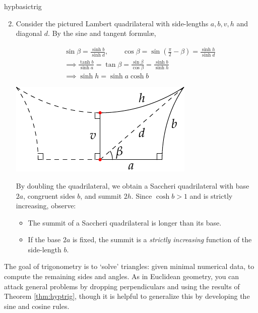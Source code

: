 \begin{examples}{}{hypbasictrig}
	
	\begin{enumerate}\setcounter{enumi}{1}
	  \item\label{ex:hyperrogueparallel} Consider the pictured Lambert quadrilateral with side-lengths $a,b,v,h$ and diagonal $d$. By the sine and tangent formulæ,\par
	  \begin{minipage}[t]{0.6\linewidth}\vspace{-17pt}
	  	\begin{align*}
			&\sin\beta=\frac{\sinh b}{\sinh d},\qquad
			\cos\beta=\sin(\tfrac\pi 2-\beta)=\frac{\sinh h}{\sinh d}\\
			&\implies \frac{\tanh b}{\sinh a}=\tan\beta=\frac{\sin\beta}{\cos\beta} =\frac{\sinh b}{\sinh h}\\
			&\implies \sinh h=\sinh a\cosh b
		\end{align*}
	  \end{minipage}
	  \hfill
	  \begin{minipage}[t]{0.39\linewidth}\vspace{-12pt}
	  	\flushright\includegraphics[scale=0.95]{isom-lambert}
	  \end{minipage}\par
		By doubling the quadrilateral, we obtain a Saccheri quadrilateral with base $2a$, congruent sides $b$, and summit $2h$.  Since $\cosh b>1$ and is strictly increasing, observe:
		\begin{itemize}
		  \item The summit of a Saccheri quadrilateral is longer than its base.
		  \item If the base $2a$ is fixed, the summit is a \emph{strictly increasing} function of the side-length $b$.
		\end{itemize}
	\end{enumerate}
\end{examples}


The goal of trigonometry is to `solve' triangles: given minimal numerical data, to compute the remaining sides and angles. As in Euclidean geometry, you can attack general problems by dropping perpendiculars and using the results of Theorem \ref{thm:hyptrig}, though it is helpful to generalize this by developing the sine and cosine rules.

